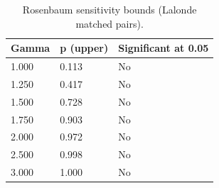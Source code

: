 \begin{table}[t!]
\centering
\footnotesize
\caption{Rosenbaum sensitivity bounds (Lalonde matched pairs).}
\label{tab:paper-rosenbaum-bounds}
\setlength{\tabcolsep}{4.5pt}
\begin{tabular}{lll}
\hline
Gamma & p (upper) & Significant at 0.05 \\
\hline
1.000 & 0.113 & No \\
1.250 & 0.417 & No \\
1.500 & 0.728 & No \\
1.750 & 0.903 & No \\
2.000 & 0.972 & No \\
2.500 & 0.998 & No \\
3.000 & 1.000 & No \\
\hline
\end{tabular}
\end{table}
